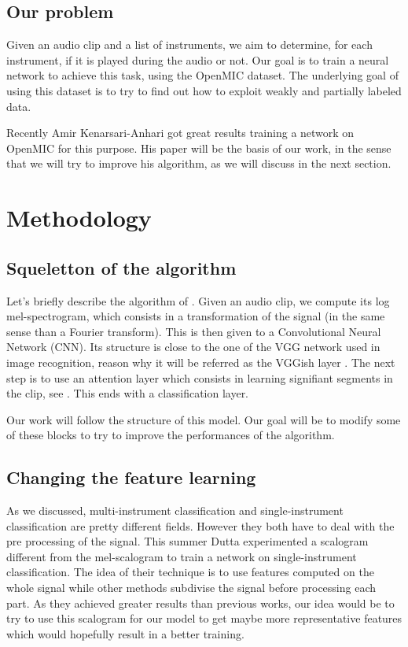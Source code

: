 \documentclass[final]{cvpr}
\begin{document}
\subsection{Our problem}

Given an audio clip and a list of instruments, we aim to determine, for each instrument, if it is played during the audio or not. Our goal is to train a neural network to achieve this task, using the OpenMIC dataset. The underlying goal of using this dataset is to try to find out how to exploit weakly and partially labeled data. 

Recently Amir Kenarsari-Anhari \cite{squelette_progr} got great results training a network on OpenMIC for this purpose. His paper will be the basis of our work, in the sense that we will try to improve his algorithm, as we will discuss in the next section.
\section{Methodology}
\subsection{Squeletton of the algorithm}
Let's briefly describe the algorithm of \cite{squelette_progr}. Given an audio clip, we compute its log mel-spectrogram, which consists in a transformation of the signal (in the same sense than a Fourier transform). This is then given to a Convolutional Neural Network (CNN). Its structure is close to the one of the VGG network used in image recognition, reason why it will be referred as the VGGish layer \cite{VGGish_net}. The next step is to use an attention layer which consists in learning signifiant segments in the clip, see \cite{attention}. This ends with a classification layer.

Our work will follow the structure of this model. Our goal will be to modify some of these blocks to try to improve the performances of the algorithm.
\subsection{Changing the feature learning}
As we discussed, multi-instrument classification and single-instrument classification are pretty different fields. However they both have to deal with the pre processing of the signal. This summer Dutta \etal \cite{features_descr} experimented a scalogram different from the mel-scalogram to train a network on single-instrument classification. The idea of their technique is to use features computed on the whole signal while other methods subdivise the signal before processing each part. As they achieved greater results than previous works, our idea would be to try to use this scalogram for our model to get maybe more representative features which would hopefully result in a better training. 
\end{document}
